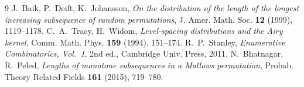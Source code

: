 \documentclass[12pt]{article}
\theoremstyle{definition}
\begin{document}
\begin{thebibliography}{9}
 J.~Baik, P.~Deift, K.~Johansson, \emph{On the distribution of the length
of the longest increasing subsequence of random permutations}, J. Amer. Math. Soc.
\textbf{12} (1999), 1119--1178.
 C.~A.~Tracy, H.~Widom, \emph{Level-spacing distributions and the Airy
kernel}, Comm. Math. Phys. \textbf{159} (1994), 151--174.
 R.~P.~Stanley, \emph{Enumerative Combinatorics, Vol.~1}, 2nd ed.,
Cambridge Univ. Press, 2011.
 N.~Bhatnagar, R.~Peled, \emph{Lengths of monotone subsequences in a
Mallows permutation}, Probab. Theory Related Fields \textbf{161} (2015), 719--780.
\end{thebibliography}
\end{document}
